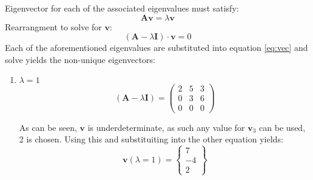 Eigenvector for each of the associated eigenvalues must satisfy:
\begin{equation}
	\boldsymbol{A}\boldsymbol{v}=\lambda\boldsymbol{v}
\end{equation}
Rearrangment to solve for $\boldsymbol{v}$:
\begin{equation}
	\left(\boldsymbol{A}-\lambda\boldsymbol{I}\right) \cdot \boldsymbol{v}=0
	\label{eq:vec}
\end{equation}
Each of the aforementioned eigenvalues are substituted into equation \ref{eq:vec} and solve yields the non-unique eigenvectors:
\begin{enumerate}
	\item $\lambda=1$
		\begin{equation*}
		\left(\boldsymbol{A}-\lambda\boldsymbol{I}\right)=
		\begin{pmatrix}
			2&5&3\\0&3&6\\0&0&0
		\end{pmatrix}
		\end{equation*}

As can be seen, $\boldsymbol{v}$ is underdeterminate, as such any value for $\boldsymbol{v}_3$ can be used, 2 is chosen. Using this and substituiting into the other equation yields:
	\begin{equation*}
	\boxed{
			\boldsymbol{v}\left(\lambda=1\right)=
		\begin{Bmatrix}
			7\\-4\\2
		\end{Bmatrix}}
	\end{equation*}


\end{enumerate}
